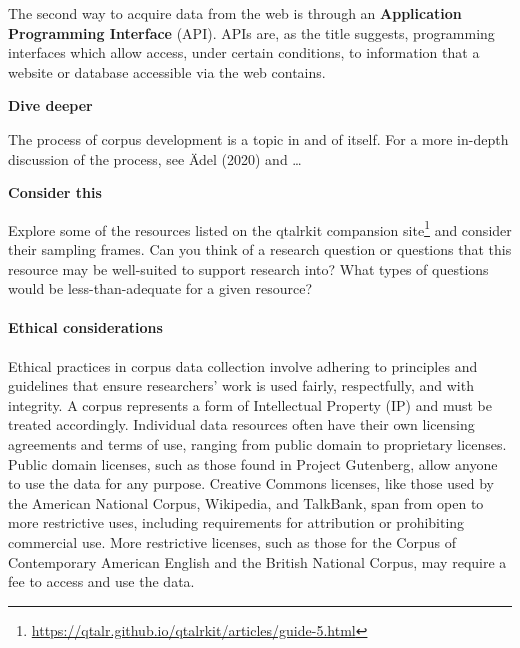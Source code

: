 \documentclass[
  letterpaper,
]{latex/krantz}
\let\oldparagraph\paragraph
\renewcommand{\paragraph}[1]{\oldparagraph{#1}\mbox{}}
\DeclareRobustCommand{\href}[2]{#2\footnote{\url{#1}}}
\begin{document}
The second way to acquire data from the web is through an
\textbf{Application Programming Interface} (API). APIs are, as the title
suggests, programming interfaces which allow access, under certain
conditions, to information that a website or database accessible via the
web contains.

\begin{tcolorbox}[enhanced jigsaw, arc=.35mm, leftrule=.75mm, rightrule=.15mm, opacityback=0, colback=white, breakable, bottomrule=.15mm, left=2mm, toprule=.15mm]

\textbf{ Dive deeper}

The process of corpus development is a topic in and of itself. For a
more in-depth discussion of the process, see Ädel (2020) and \ldots{}

\end{tcolorbox}

\begin{tcolorbox}[enhanced jigsaw, arc=.35mm, leftrule=.75mm, rightrule=.15mm, opacityback=0, colback=white, breakable, bottomrule=.15mm, left=2mm, toprule=.15mm]

\textbf{ Consider this}

Explore some of the resources listed on the
\href{https://qtalr.github.io/qtalrkit/articles/guide-5.html}{qtalrkit
compansion site} and consider their sampling frames. Can you think of a
research question or questions that this resource may be well-suited to
support research into? What types of questions would be
less-than-adequate for a given resource?

\end{tcolorbox}

\hypertarget{ethical-considerations}{%
\paragraph{Ethical considerations}\label{ethical-considerations}}

Ethical practices in corpus data collection involve adhering to
principles and guidelines that ensure researchers' work is used fairly,
respectfully, and with integrity. A corpus represents a form of
Intellectual Property (IP) and must be treated accordingly. Individual
data resources often have their own licensing agreements and terms of
use, ranging from public domain to proprietary licenses. Public domain
licenses, such as those found in Project Gutenberg, allow anyone to use
the data for any purpose. Creative Commons licenses, like those used by
the American National Corpus, Wikipedia, and TalkBank, span from open to
more restrictive uses, including requirements for attribution or
prohibiting commercial use. More restrictive licenses, such as those for
the Corpus of Contemporary American English and the British National
Corpus, may require a fee to access and use the data.
\end{document}

